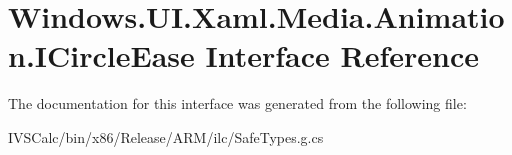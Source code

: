 \hypertarget{interface_windows_1_1_u_i_1_1_xaml_1_1_media_1_1_animation_1_1_i_circle_ease}{}\section{Windows.\+U\+I.\+Xaml.\+Media.\+Animation.\+I\+Circle\+Ease Interface Reference}
\label{interface_windows_1_1_u_i_1_1_xaml_1_1_media_1_1_animation_1_1_i_circle_ease}


The documentation for this interface was generated from the following file\+:\begin{DoxyCompactItemize}
\item 
I\+V\+S\+Calc/bin/x86/\+Release/\+A\+R\+M/ilc/Safe\+Types.\+g.\+cs\end{DoxyCompactItemize}
